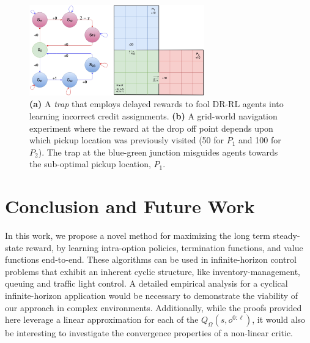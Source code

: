 \documentclass[letterpaper]{article} %
\begin{document}
\begin{figure}[t]
\centering
\includegraphics[width=0.9\columnwidth,height=1.54in ]{BadCreditAndFRms.jpg} %
\caption{ \textbf{(a)} A \textit{trap} that employs delayed rewards to fool DR-RL agents into learning incorrect credit assignments. \textbf{(b)} A grid-world navigation experiment where the reward at the drop off point depends upon which pickup location was previously visited (50 for $P_1$ and 100 for $P_2$). The trap at the blue-green junction misguides agents towards the sub-optimal pickup location, $P_1$. }
\label{fig3}
\end{figure}

\vspace{-2.88mm}
\section{Conclusion and Future Work}
In this work, we propose a novel method for maximizing the long term steady-state reward, by learning intra-option policies, termination functions, and value functions end-to-end. These algorithms can be used in infinite-horizon control problems that exhibit an inherent cyclic structure, like inventory-management, queuing and traffic light control. A detailed empirical analysis for a cyclical infinite-horizon application would be necessary to demonstrate the viability of our approach in complex environments. Additionally, while the proofs provided here leverage a linear approximation for each of the $Q_\Omega(s,o^{0:\ell})$, it would also be interesting to investigate the convergence properties of a non-linear critic.
\end{document}
